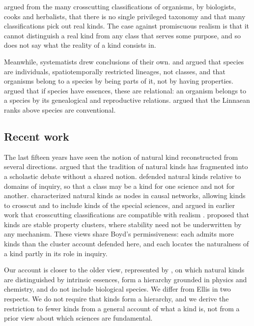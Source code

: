 \documentclass{situationist-preprint}
\begin{document}
\citet{Dupre1981,Dupre1993} argued from the many crosscutting classifications of organisms, by biologists, cooks and herbalists, that there is no single privileged taxonomy and that many classifications pick out real kinds. The case against promiscuous realism is that it cannot distinguish a real kind from any class that serves some purpose, and so does not say what the reality of a kind consists in.

Meanwhile, systematists drew conclusions of their own. \citet{Ghiselin1974} and \citet{Hull1978} argued that species are individuals, spatiotemporally restricted lineages, not classes, and that organisms belong to a species by being parts of it, not by having properties. \citet{Okasha2002} argued that if species have essences, these are relational: an organism belongs to a species by its genealogical and reproductive relations. \citet{Ereshefsky2001} argued that the Linnaean ranks above species are conventional.

\subsection{Recent work}\label{s:recent}

The last fifteen years have seen the notion of natural kind reconstructed from several directions. \citet{Hacking2007} argued that the tradition of natural kinds has fragmented into a scholastic debate without a shared notion. \citet{Magnus2012} defended natural kinds relative to domains of inquiry, so that a class may be a kind for one science and not for another. \citet{Khalidi2013} characterized natural kinds as nodes in causal networks, allowing kinds to crosscut and to include kinds of the special sciences, and argued in earlier work that crosscutting classifications are compatible with realism \citep{Khalidi1998}. \citet{Slater2015} proposed that kinds are stable property clusters, where stability need not be underwritten by any mechanism. These views share Boyd's permissiveness: each admits more kinds than the cluster account defended here, and each locates the naturalness of a kind partly in its role in inquiry.

Our account is closer to the older view, represented by \citet{Ellis2001}, on which natural kinds are distinguished by intrinsic essences, form a hierarchy grounded in physics and chemistry, and do not include biological species. We differ from Ellis in two respects. We do not require that kinds form a hierarchy, and we derive the restriction to fewer kinds from a general account of what a kind is, not from a prior view about which sciences are fundamental.
\end{document}
